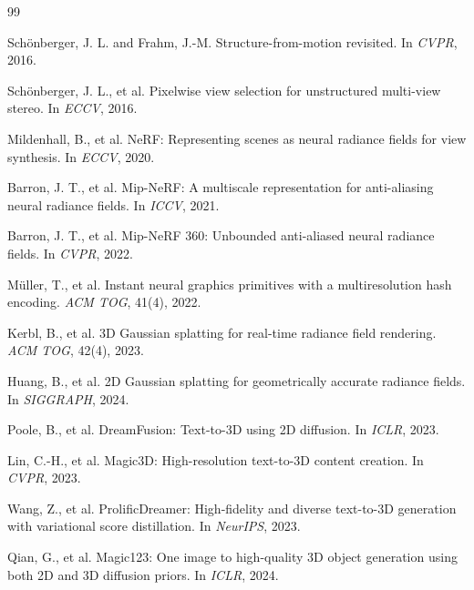 \documentclass[10pt,twocolumn,letterpaper]{article}
\begin{document}
{\small
\begin{thebibliography}{99}

Sch\"onberger, J. L. and Frahm, J.-M.
\newblock Structure-from-motion revisited.
\newblock In \emph{CVPR}, 2016.

Sch\"onberger, J. L., et al.
\newblock Pixelwise view selection for unstructured multi-view stereo.
\newblock In \emph{ECCV}, 2016.

Mildenhall, B., et al.
\newblock NeRF: Representing scenes as neural radiance fields for view synthesis.
\newblock In \emph{ECCV}, 2020.

Barron, J. T., et al.
\newblock Mip-NeRF: A multiscale representation for anti-aliasing neural radiance fields.
\newblock In \emph{ICCV}, 2021.

Barron, J. T., et al.
\newblock Mip-NeRF 360: Unbounded anti-aliased neural radiance fields.
\newblock In \emph{CVPR}, 2022.

M\"uller, T., et al.
\newblock Instant neural graphics primitives with a multiresolution hash encoding.
\newblock \emph{ACM TOG}, 41(4), 2022.

Kerbl, B., et al.
\newblock 3D Gaussian splatting for real-time radiance field rendering.
\newblock \emph{ACM TOG}, 42(4), 2023.

Huang, B., et al.
\newblock 2D Gaussian splatting for geometrically accurate radiance fields.
\newblock In \emph{SIGGRAPH}, 2024.

Poole, B., et al.
\newblock DreamFusion: Text-to-3D using 2D diffusion.
\newblock In \emph{ICLR}, 2023.

Lin, C.-H., et al.
\newblock Magic3D: High-resolution text-to-3D content creation.
\newblock In \emph{CVPR}, 2023.

Wang, Z., et al.
\newblock ProlificDreamer: High-fidelity and diverse text-to-3D generation with variational score distillation.
\newblock In \emph{NeurIPS}, 2023.

Qian, G., et al.
\newblock Magic123: One image to high-quality 3D object generation using both 2D and 3D diffusion priors.
\newblock In \emph{ICLR}, 2024.


\end{thebibliography}}
\end{document}
